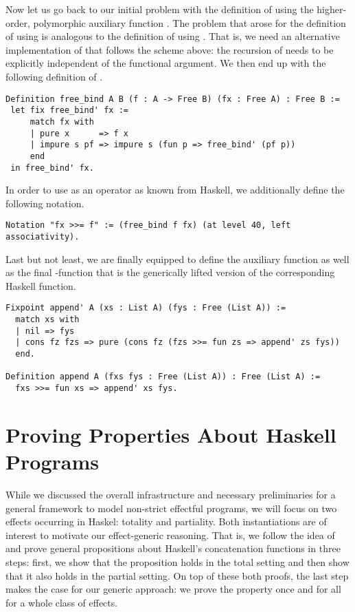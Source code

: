Now let us go back to our initial problem with the definition of  using the higher\--order, polymorphic auxiliary function .
The problem that arose for the definition of  using  is analogous to the definition of  using .
That is, we need an alternative implementation of  that follows the scheme above: the recursion of  needs to be explicitly independent of the functional argument.
We then end up with the following definition of .

\begin{verbatim}
Definition free_bind A B (f : A -> Free B) (fx : Free A) : Free B :=
 let fix free_bind' fx :=
     match fx with
     | pure x      => f x
     | impure s pf => impure s (fun p => free_bind' (pf p))
     end
 in free_bind' fx.
\end{verbatim}

In order to use  as an operator \cinl{(>>=)} as known from Haskell, we additionally define the following notation.

\begin{verbatim}
Notation "fx >>= f" := (free_bind f fx) (at level 40, left associativity).
\end{verbatim}

Last but not least, we are finally equipped to define the auxiliary function  as well as the final \--function that is the generically lifted version of the corresponding Haskell function.

\begin{verbatim}
Fixpoint append' A (xs : List A) (fys : Free (List A)) :=
  match xs with
  | nil => fys
  | cons fz fzs => pure (cons fz (fzs >>= fun zs => append' zs fys))
  end.

Definition append A (fxs fys : Free (List A)) : Free (List A) :=
  fxs >>= fun xs => append' xs fys.
\end{verbatim}

\section{Proving Properties About Haskell Programs}

While we discussed the overall infrastructure and necessary preliminaries for a general framework to model non\--strict effectful
programs, we will focus on two effects occurring in Haskel: totality and partiality.
Both instantiations are of interest to motivate our effect\--generic reasoning.
That is, we follow the idea of \citet{abel2005verifying} and prove general propositions about Haskell's concatenation functions in three steps: first, we show that the proposition holds in the total setting and then show that it also holds in the partial setting.
On top of these both proofs, the last step makes the case for our generic approach: we prove the property once and for all for a whole class of effects.

